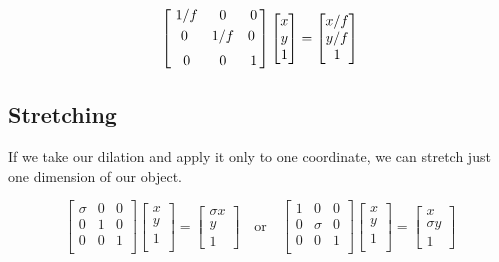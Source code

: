 \documentclass{article}
\begin{document}
\[%
    \begin{bmatrix} \vspace{1mm}
        \ 1/f  & 0 & 0 \\ \vspace{1mm} 
        0 & 1/f  & 0 \vspace{1mm}  \ \\ 
	    \ 0 & 0 & 1 \\		     
    \end{bmatrix}
    \begin{bmatrix} x\\y\\1 \end{bmatrix}
    =
    \begin{bmatrix}
        {x}/{f}  \\
        {y}/{f}  \\
		1 \\		
    \end{bmatrix}
\]%

\begin{figure}[!htbp]
    \centering
\end{figure}


\subsection{Stretching} 

If we take our dilation and apply it only to one coordinate, we can stretch just
one dimension of our object.

\[%
       \begin{bmatrix} 
        \sigma & 0 & 0 \\
		0 & 1 & 0 \\
		0 & 0 & 1 \\		
    \end{bmatrix}
    \begin{bmatrix}
        x \\
        y \\
		1 \\		
    \end{bmatrix}
    =
    \begin{bmatrix} \sigma x \\  y \\ 1 \end{bmatrix}
    \quad
    \text{or}
    \quad
    \begin{bmatrix} 
        1 & 0 & 0 \\
		0 & \sigma & 0 \\
		0 & 0 & 1 \\		
    \end{bmatrix}
    \begin{bmatrix}
        x \\
        y \\
		1 \\		
    \end{bmatrix}
    =
    \begin{bmatrix} x \\ \sigma y \\ 1 \end{bmatrix}\]%
\end{document}
